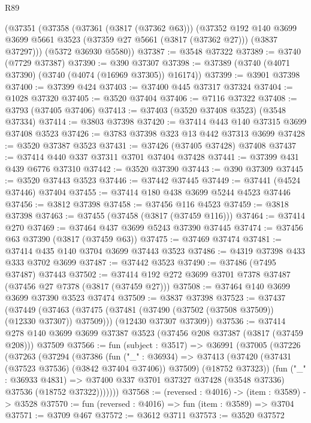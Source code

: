 \begin{lexlean}{R89}
\begin{coremodule}
    (@37351
      (@37358
        (@37361 (@3817 (@37362 @63)))
        (@37352
          @192
          @140
          @3699
          @3699
          @5661
          @3523
          (@37359 @27 @5661 (@3817 (@37362 @27)))
          (@3837 @37297)))
      (@5372 @36930 @5580))
@37387 := @3548 @37322
@37389 := @3740 (@7729 @37387)
@37390 := @390 @37307
@37398 := @37389 (@3740 (@4071 @37390) (@3740 (@4074 (@16969 @37305)) @16174))
@37399 := @3901 @37398
@37400 := @37399 @424
@37403 := @37400 @445 @37317 @37324
@37404 := @1028 @37320
@37405 := @3520 @37404
@37406 := @7116 @37322
@37408 := @3793 (@37405 @37406)
@37413 := @37403 (@3520 @37408 @3523) (@3548 @37334)
@37414 := @3803 @37398
@37420 := @37414 @443 @140 @37315 @3699 @37408 @3523
@37426 := @3783 @37398 @323 @13 @442 @37313 @3699
@37428 := @3520 @37387 @3523
@37431 := @37426 (@37405 @37428) @37408
@37437 := @37414 @440 @337 @37311 @3701 @37404 @37428
@37441 := @37399 @431 @439 @6776 @37310
@37442 := @3520 @37390
@37443 := @390 @37309
@37445 := @3520 @37443 @3523
@37446 := @37442 @37445
@37449 := @37441 (@4524 @37446) @37404
@37455 := @37414 @180 @438 @3699 @5244 @4523 @37446
@37456 := @3812 @37398
@37458 := @37456 @116 @4523
@37459 := @3818 @37398
@37463 := @37455 (@37458 (@3817 (@37459 @116)))
@37464 := @37414 @270
@37469 := @37464 @437 @3699 @5243 @37390 @37445
@37474 := @37456 @63 @37390 (@3817 (@37459 @63))
@37475 := @37469 @37474
@37481 := @37414 @435 @140 @3704 @3699 @37443 @3523
@37486 := @4319 @37398 @433 @333 @3702 @3699
@37487 := @37442 @3523
@37490 := @37486 (@7495 @37487) @37443
@37502 := @37414 @192 @272 @3699 @3701 @7378 @37487 (@37456 @27 @7378 (@3817 (@37459 @27)))
@37508 := @37464 @140 @3699 @3699 @37390 @3523 @37474
@37509 := @3837 @37398
@37523 := @37437
    (@37449
      (@37463 (@37475 (@37481 (@37490 (@37502 (@37508 @37509)) (@12330 @37307)) @37509)))
      (@12430 @37307 @37309))
@37536 := @37414
    @278
    @140
    @3699
    @3699
    @37387
    @3523
    (@37456 @208 @37387 (@3817 (@37459 @208)))
    @37509
@37566 := fun (subject : @3517) =>
  @36991
    (@37005
      (@37226
        (@37263
          (@37294
            (@37386
              (fun ("_" : @36934) =>
              @37413 (@37420 (@37431 (@37523 @37536) (@3842 @37404 @37406)) @37509) (@18752 @37323))
              (fun ("_" : @36933 @4831) =>
              @37400 @337 @3701 @37327 @37428 (@3548 @37336) @37536 (@18752 @37322)))))))
@37568 := (reversed : @4016) -> (item : @3589) -> @3528
@37570 := fun (reversed : @4016) => fun (item : @3589) => @3704
@37571 := @3709 @467
@37572 := @3612 @3711
@37573 := @3520 @37572

\end{coremodule}
\end{lexlean}
